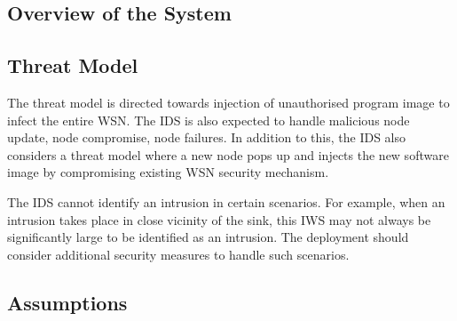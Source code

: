 \documentclass[conference,manuscript]{IEEEtran}
\begin{document}
\subsection{Overview of the System}
\label{sec:des}


\subsection{Threat Model}


The threat model is directed towards injection of unauthorised program image to infect the entire WSN.
The IDS is also expected to handle malicious node update, node compromise, node failures.
In addition to this, the IDS also considers a threat model where a new node pops up and injects the new software image by compromising existing WSN security mechanism.


The IDS cannot identify an intrusion in certain scenarios.
For example, when an intrusion takes place in close vicinity of the sink, this IWS may not always be significantly large to be identified as an intrusion. 
The deployment should consider additional security measures to handle such scenarios.


\subsection{Assumptions} %
\label{sc:assump}
\end{document}
